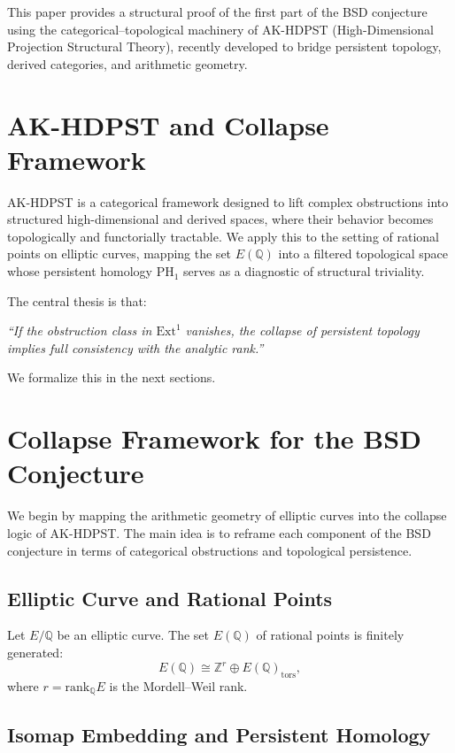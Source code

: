 This paper provides a structural proof of the first part of the BSD conjecture using the categorical–topological machinery of AK-HDPST (High-Dimensional Projection Structural Theory), recently developed to bridge persistent topology, derived categories, and arithmetic geometry.

\section{AK-HDPST and Collapse Framework}

AK-HDPST is a categorical framework designed to lift complex obstructions into structured high-dimensional and derived spaces, where their behavior becomes topologically and functorially tractable.  
We apply this to the setting of rational points on elliptic curves, mapping the set \( E(\mathbb{Q}) \) into a filtered topological space whose persistent homology \( \mathrm{PH}_1 \) serves as a diagnostic of structural triviality.

\medskip

The central thesis is that:
\begin{center}
\textit{“If the obstruction class in \( \mathrm{Ext}^1 \) vanishes, the collapse of persistent topology implies full consistency with the analytic rank.”}
\end{center}

We formalize this in the next sections.


\section{Collapse Framework for the BSD Conjecture}

We begin by mapping the arithmetic geometry of elliptic curves into the collapse logic of AK-HDPST. The main idea is to reframe each component of the BSD conjecture in terms of categorical obstructions and topological persistence.

\subsection{Elliptic Curve and Rational Points}

Let \( E/\mathbb{Q} \) be an elliptic curve. The set \( E(\mathbb{Q}) \) of rational points is finitely generated:
\[
E(\mathbb{Q}) \cong \mathbb{Z}^r \oplus E(\mathbb{Q})_{\text{tors}},
\]
where \( r = \mathrm{rank}_\mathbb{Q}E \) is the Mordell–Weil rank.

\subsection{Isomap Embedding and Persistent Homology}

